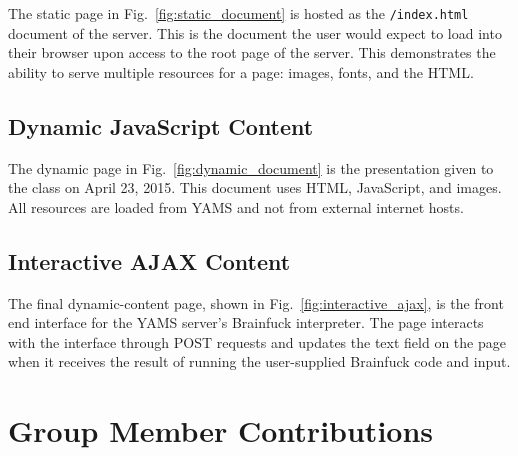 \documentclass[journal,10pt]{IEEEtran}
\begin{document}
The static page in Fig.~\ref{fig:static_document} is hosted as the
\texttt{/index.html} document of the server. This is the document the user would
expect to load into their browser upon access to the root page of the server.
This demonstrates the ability to serve multiple resources for a page: images,
fonts, and the HTML.

\subsection{Dynamic JavaScript Content}

The dynamic page in Fig.~\ref{fig:dynamic_document} is the presentation given to
the class on April 23, 2015. This document uses HTML, JavaScript, and images.
All resources are loaded from YAMS and not from external internet hosts.

\subsection{Interactive AJAX Content}

The final dynamic-content page, shown in Fig.~\ref{fig:interactive_ajax}, is the
front end interface for the YAMS server's Brainfuck\cite{Mpreu/preller}
interpreter. The page interacts with the interface through POST requests and
updates the text field on the page when it receives the result of running the
user-supplied Brainfuck code and input.

\section{Group Member Contributions}
\end{document}
